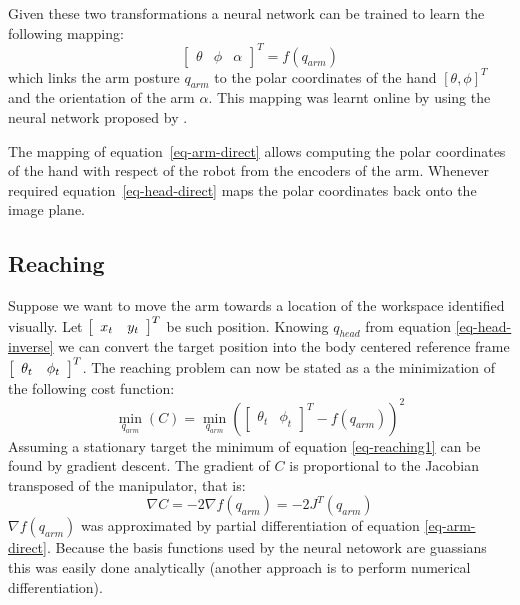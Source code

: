 Given these two transformations a neural network can be trained to
learn the following mapping:
%
\begin{equation}
  \left[\begin{array}{ccc}
    \theta & \phi & \alpha
    \end{array}\right]^T
  = f \left(q_{arm}\right)
\label{eq-arm-direct}
\end{equation}
%
which links the arm posture $q_{arm}$ to the polar coordinates of
the hand $\left[\theta, \phi\right]^T$ and the orientation of the
arm $\alpha$. This mapping was learnt online by using the neural network
proposed by \cite{schaal98Constructive}.

The mapping of equation~\ref{eq-arm-direct} allows computing 
the polar coordinates of the hand with respect of the robot 
from the encoders of the arm. Whenever required 
equation~\ref{eq-head-direct} maps the polar coordinates
back onto the image plane.

\subsection{Reaching}
\label{sec:reaching}
%
Suppose we want to move the arm towards a
location of the workspace identified visually. Let
$\left[\begin{array}{c c} x_t & y_t\end{array}\right]^T$ be such
position. Knowing $q_{head}$ from equation \ref{eq-head-inverse}
we can convert the target position into the body centered
reference frame $\left[\begin{array}{c c} \theta_t  &
\phi_t\end{array}\right]^T$. The reaching problem can now be stated
as a the minimization of the following cost function:
%
\begin{equation}
  \displaystyle\min_{q_{arm}}\left(C\right)=\displaystyle\min_{q_{arm}}\left(
  \left[
  \begin{array}{cc}
    \theta_t & \phi_t 
    \end{array}\right]^T
  -f \left(q_{arm}\right)
  \right)^2
\label{eq-reaching1}
\end{equation}
%
Assuming a stationary target the minimum of equation \ref{eq-reaching1}
can be found by gradient descent. The gradient of $C$ is proportional
to the Jacobian transposed of the manipulator, that is:
%
\begin{equation}
  \nabla C=-2\nabla f\left(q_{arm}\right)=-2J^T\left(q_{arm}\right)
\label{eq-gradient}
\end{equation}
%
$\nabla f\left(q_{arm}\right)$ was approximated by partial
 differentiation of equation \ref{eq-arm-direct}. Because 
the basis functions used by the neural netowork are guassians
this was easily done analytically (another approach is to perform
numerical differentiation).

